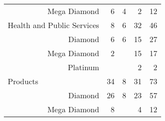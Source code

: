 \begin{table}[]
\begin{tabular}{@{}r|rrrr@{}}
Mega Diamond                                                & 6                                                  & 4                                                            & 2                                                           & 12                                                        \\
\multicolumn{1}{l|}{Health and Public Services}             & 8                                                  & 6                                                            & 32                                                          & 46                                                        \\
Diamond                                                     & 6                                                  & 6                                                            & 15                                                          & 27                                                        \\
Mega Diamond                                                & 2                                                  &                                                              & 15                                                          & 17                                                        \\
Platinum                                                    &                                                    &                                                              & 2                                                           & 2                                                         \\
\multicolumn{1}{l|}{Products}                               & 34                                                 & 8                                                            & 31                                                          & 73                                                        \\
Diamond                                                     & 26                                                 & 8                                                            & 23                                                          & 57                                                        \\
Mega Diamond                                                & 8                                                  &                                                              & 4                                                           & 12                                                        \\

\end{tabular}
\end{table}
